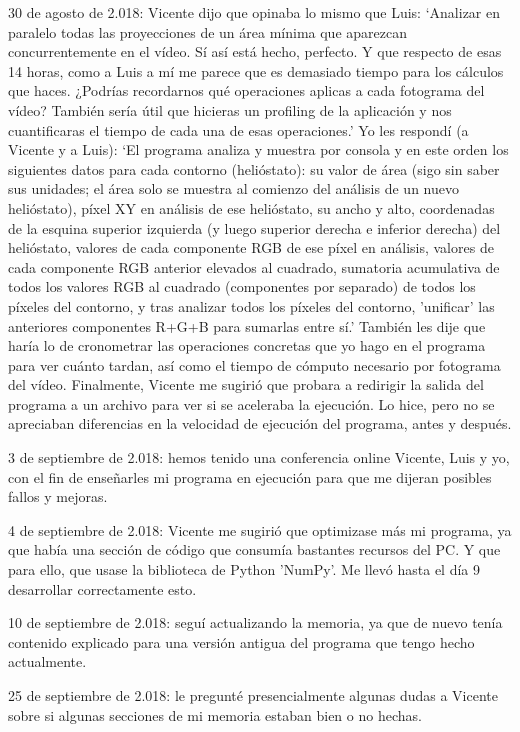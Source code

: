 30 de agosto de 2.018: Vicente dijo que opinaba lo mismo que Luis: ‘Analizar en paralelo todas las proyecciones de un área mínima que aparezcan concurrentemente en el vídeo. Sí así está hecho, perfecto. Y que respecto de esas 14 horas, como a Luis a mí me parece que es demasiado tiempo para los cálculos que haces. ¿Podrías recordarnos qué operaciones aplicas a cada fotograma del vídeo? También sería útil que hicieras un profiling de la aplicación y nos cuantificaras el tiempo de cada una de esas operaciones.’ Yo les respondí (a Vicente y a Luis): ‘El programa analiza y muestra por consola y en este orden los siguientes datos para cada contorno (helióstato): su valor de área (sigo sin saber sus unidades; el área solo se muestra al comienzo del análisis de un nuevo helióstato), píxel XY en análisis de ese helióstato, su ancho y alto, coordenadas de la esquina superior izquierda (y luego superior derecha e inferior derecha) del helióstato, valores de cada componente RGB de ese píxel en análisis, valores de cada componente RGB anterior elevados al cuadrado, sumatoria acumulativa de todos los valores RGB al cuadrado (componentes por separado) de todos los píxeles del contorno, y tras analizar todos los píxeles del contorno, 'unificar' las anteriores componentes R+G+B para sumarlas entre sí.’ También les dije que haría lo de cronometrar las operaciones concretas que yo hago en el programa para ver cuánto tardan, así como el tiempo de cómputo necesario por fotograma del vídeo. Finalmente, Vicente me sugirió que probara a redirigir la salida del programa a un archivo para ver si se aceleraba la ejecución. Lo hice, pero no se apreciaban diferencias en la velocidad de ejecución del programa, antes y después.

3 de septiembre de 2.018: hemos tenido una conferencia online Vicente, Luis y yo, con el fin de enseñarles mi programa en ejecución para que me dijeran posibles fallos y mejoras.

4 de septiembre de 2.018: Vicente me sugirió que optimizase más mi programa, ya que había una sección de código que consumía bastantes recursos del PC. Y que para ello, que usase la biblioteca de Python 'NumPy'. Me llevó hasta el día 9 desarrollar correctamente esto.

10 de septiembre de 2.018: seguí actualizando la memoria, ya que de nuevo tenía contenido explicado para una versión antigua del programa que tengo hecho actualmente.

25 de septiembre de 2.018: le pregunté presencialmente algunas dudas a Vicente sobre si algunas secciones de mi memoria estaban bien o no hechas.

